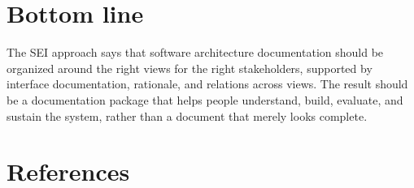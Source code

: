 \documentclass[11pt]{article}
\begin{document}
\section*{Bottom line}

The SEI approach says that software architecture documentation should be organized around the right views for the right stakeholders, supported by interface documentation, rationale, and relations across views. The result should be a documentation package that helps people understand, build, evaluate, and sustain the system, rather than a document that merely looks complete.\cite{sei-vb-factsheet,sei-book-page,sei-interfaces}

\section*{References}
\end{document}
